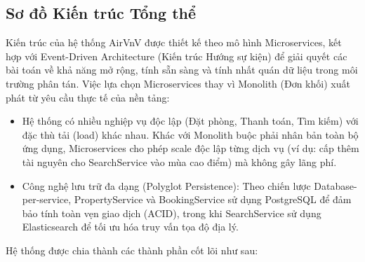 \subsection{Sơ đồ Kiến trúc Tổng thể}
\label{subsec:so_do_kien_truc}

Kiến trúc của hệ thống AirVnV được thiết kế theo mô hình Microservices, kết hợp với Event-Driven Architecture (Kiến trúc Hướng sự kiện) để giải quyết các bài toán về khả năng mở rộng, tính sẵn sàng và tính nhất quán dữ liệu trong môi trường phân tán. Việc lựa chọn Microservices thay vì Monolith (Đơn khối) xuất phát từ yêu cầu thực tế của nền tảng:
\begin{itemize}
  \item Hệ thống có nhiều nghiệp vụ độc lập (Đặt phòng, Thanh toán, Tìm kiếm) với đặc thù tải (load) khác nhau. Khác với Monolith buộc phải nhân bản toàn bộ ứng dụng, Microservices cho phép scale độc lập từng dịch vụ (ví dụ: cấp thêm tài nguyên cho SearchService vào mùa cao điểm) mà không gây lãng phí.
  \item Công nghệ lưu trữ đa dạng (Polyglot Persistence): Theo chiến lược Database-per-service, PropertyService và BookingService sử dụng PostgreSQL để đảm bảo tính toàn vẹn giao dịch (ACID), trong khi SearchService sử dụng Elasticsearch để tối ưu hóa truy vấn tọa độ địa lý.
\end{itemize}

Hệ thống được chia thành các thành phần cốt lõi như sau:

